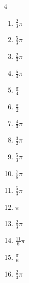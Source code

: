 \begin{multicols}{4}
\begin{enumerate}
  \item $\displaystyle \frac{2}{3}\pi$

  \item $\displaystyle \frac{5}{3}\pi$

  \item $\displaystyle \frac{2}{3}\pi$

  \item $\displaystyle \frac{5}{4}\pi$

  \item $\displaystyle \frac{\pi}{4}$

  \item $\displaystyle \frac{\pi}{2}$

  \item $\displaystyle \frac{4}{3}\pi$

  \item $\displaystyle \frac{3}{2}\pi$

  \item $\displaystyle \frac{5}{3}\pi$

  \item $\displaystyle \frac{7}{6}\pi$

  \item $\displaystyle \frac{5}{3}\pi$

  \item $\displaystyle \pi$

  \item $\displaystyle \frac{2}{3}\pi$

  \item $\displaystyle \frac{11}{6}\pi$

  \item $\displaystyle \frac{\pi}{6}$

  \item $\displaystyle \frac{2}{3}\pi$


\end{enumerate}
\end{multicols}
